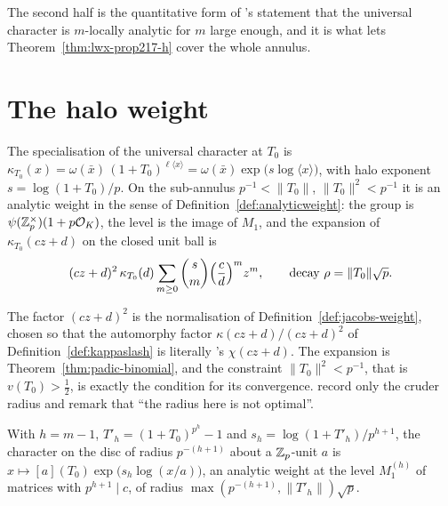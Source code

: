The second half is the quantitative form of \cite[\S2.7]{LWX}'s statement that the universal
character is $m$-locally analytic for $m$ large enough, and it is what lets
Theorem~\ref{thm:lwx-prop217-h} cover the whole annulus.

\section{The halo weight}
\label{sec:haloweight}

\begin{definition}
  \label{def:haloweight}
  \leanok
  The specialisation of the universal character at $T_0$ is
  $\kappa_{T_0}(x) = \omega(\bar x)\,(1+T_0)^{\ell\langle x\rangle}
  = \omega(\bar x)\exp\bigl(s\log\langle x\rangle\bigr)$, with halo exponent
  $s = \log(1+T_0)/p$.  On the sub-annulus $p^{-1}<\lVert T_0\rVert$, $\lVert T_0\rVert^{2}<p^{-1}$
  it is an analytic weight in the sense of Definition~\ref{def:analyticweight}: the group is
  $\psi(\mathbb{Z}_p^{\times})(1+p\mathcal{O}_K)$, the level is the image of $M_1$, and the expansion of
  $\kappa_{T_0}(cz+d)$ on the closed unit ball is
  \[
    (cz+d)^{2}\,\kappa_{T_0}(d)\sum_{m\geq 0}\binom{s}{m}\Bigl(\frac{c}{d}\Bigr)^{m}z^{m},
    \qquad \text{decay } \rho = \lVert T_0\rVert\sqrt{p} .
  \]
\end{definition}

The factor $(cz+d)^{2}$ is the normalisation of Definition~\ref{def:jacobs-weight}, chosen so
that the automorphy factor $\kappa(cz+d)/(cz+d)^{2}$ of Definition~\ref{def:kappaslash} is
literally \cite[(2.3.2)]{LWX}'s $\chi(cz+d)$.  The expansion is
Theorem~\ref{thm:padic-binomial}, and the constraint $\lVert T_0\rVert^{2}<p^{-1}$, that is
$v(T_0)>\tfrac12$, is exactly the condition for its convergence.  \cite[\S2.7]{LWX} record only
the cruder radius and remark that ``the radius here is not optimal''.

\begin{definition}
  \label{def:haloweighth}
  \leanok
  With $h = m-1$, $T'_h = (1+T_0)^{p^{h}}-1$ and $s_h = \log(1+T'_h)/p^{h+1}$, the character on
  the disc of radius $p^{-(h+1)}$ about a $\mathbb{Z}_p$-unit $a$ is
  $x\mapsto [a](T_0)\exp\bigl(s_h\log(x/a)\bigr)$, an analytic weight at the level
  $M_1^{(h)}$ of matrices with $p^{h+1}\mid c$, of radius
  $\max(p^{-(h+1)}, \lVert T'_h\rVert)\sqrt p$.
\end{definition}


